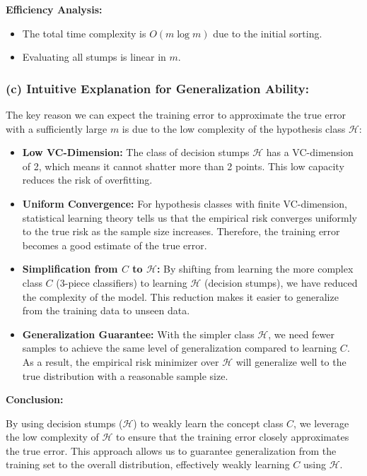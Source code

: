 \documentclass{article}
\begin{document}
\textbf{Efficiency Analysis:}
\begin{itemize}
    \item The total time complexity is \(O(m \log m)\) due to the initial sorting.
    \item Evaluating all stumps is linear in \(m\).
\end{itemize}

\subsubsection*{(c) Intuitive Explanation for Generalization Ability:}

The key reason we can expect the training error to approximate the true error with a sufficiently large \(m\) is due to the low complexity of the hypothesis class \(\mathcal{H}\):

\begin{itemize}
    \item \textbf{Low VC-Dimension:} The class of decision stumps \(\mathcal{H}\) has a VC-dimension of 2, which means it cannot shatter more than 2 points. This low capacity reduces the risk of overfitting.
    \item \textbf{Uniform Convergence:} For hypothesis classes with finite VC-dimension, statistical learning theory tells us that the empirical risk converges uniformly to the true risk as the sample size increases. Therefore, the training error becomes a good estimate of the true error.
    \item \textbf{Simplification from \(C\) to \(\mathcal{H}\):} By shifting from learning the more complex class \(C\) (3-piece classifiers) to learning \(\mathcal{H}\) (decision stumps), we have reduced the complexity of the model. This reduction makes it easier to generalize from the training data to unseen data.
    \item \textbf{Generalization Guarantee:} With the simpler class \(\mathcal{H}\), we need fewer samples to achieve the same level of generalization compared to learning \(C\). As a result, the empirical risk minimizer over \(\mathcal{H}\) will generalize well to the true distribution with a reasonable sample size.
\end{itemize}

\textbf{Conclusion:}

By using decision stumps (\(\mathcal{H}\)) to weakly learn the concept class \(C\), we leverage the low complexity of \(\mathcal{H}\) to ensure that the training error closely approximates the true error. This approach allows us to guarantee generalization from the training set to the overall distribution, effectively weakly learning \(C\) using \(\mathcal{H}\).
\end{document}
